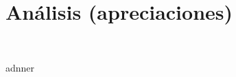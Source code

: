 \section{Análisis (apreciaciones)} 
\textbf{}\\
\begin{flushleft}


\begin{itemize}




adnner	


\end{itemize} 


\end{flushleft}